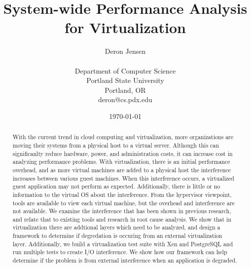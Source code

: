\documentclass[10pt,onecolumn,oneside]{article}
\begin{document}
\title{System-wide Performance Analysis for Virtualization}
\author{Deron Jensen\\
\\
Department of Computer Science\\
Portland State University\\
Portland, OR \\
deron@cs.pdx.edu \\
}
\date{\today}
  \maketitle
\newpage

\begin{abstract}
With the current trend in cloud computing and virtualization, more organizations are moving their systems from a physical host to a virtual server.  Although this can significanlty reduce hardware, power, and administration costs, it can increase cost in analyzing performance problems.  With virtualization, there is an initial performance overhead, and as more virtual machines are added to a physical host the interference increases between various guest machines.  When this interference occurs, a virtualized guest application may not perform as expected.  Additionally, there is little or no information to the virtual OS about the interference.  From the hypervisor viewpoint, tools are available to view each virtual machine, but the overhead and interference are not available. \newline
\indent  We examine the interference that has been shown in previous research, and relate that to existing tools and research in root cause analysis.  We show that in virtualization there are addtional layers which need to be analyzed, and design a framework to determine if degredation is occuring from an external virtualization layer.  Additionally, we build a virtualization test suite with Xen and PostgreSQL and run multiple tests to create I/O interference.  We show how our framework can help determine if the problem is from external interference when an application is degraded.   
  \end{abstract}
\newpage

\setcounter{page}{1}

\tableofcontents    %
\newpage
\listoftables
\newpage
\listoffigures 
\newpage
\end{document}
